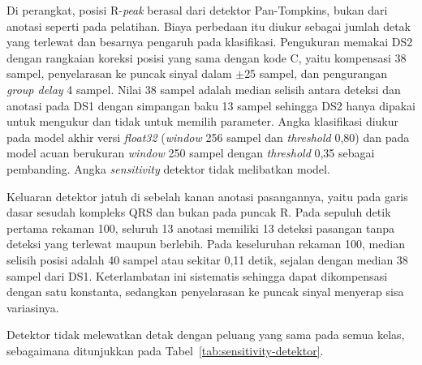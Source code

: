 Di perangkat, posisi R-\textit{peak} berasal dari detektor Pan-Tompkins, bukan dari anotasi seperti pada pelatihan. Biaya perbedaan itu diukur sebagai jumlah detak yang terlewat dan besarnya pengaruh pada klasifikasi. Pengukuran memakai DS2 dengan rangkaian koreksi posisi yang sama dengan kode C, yaitu kompensasi 38 sampel, penyelarasan ke puncak sinyal dalam $\pm$25 sampel, dan pengurangan \textit{group delay} 4 sampel. Nilai 38 sampel adalah median selisih antara deteksi dan anotasi pada DS1 dengan simpangan baku 13 sampel sehingga DS2 hanya dipakai untuk mengukur dan tidak untuk memilih parameter. Angka klasifikasi diukur pada model akhir versi \textit{float32} (\textit{window} 256 sampel dan \textit{threshold} 0,80) dan pada model acuan berukuran \textit{window} 250 sampel dengan \textit{threshold} 0,35 sebagai pembanding. Angka \textit{sensitivity} detektor tidak melibatkan model.

Keluaran detektor jatuh di sebelah kanan anotasi pasangannya, yaitu pada garis dasar sesudah kompleks QRS dan bukan pada puncak R. Pada sepuluh detik pertama rekaman 100, seluruh 13 anotasi memiliki 13 deteksi pasangan tanpa deteksi yang terlewat maupun berlebih. Pada keseluruhan rekaman 100, median selisih posisi adalah 40 sampel atau sekitar 0,11 detik, sejalan dengan median 38 sampel dari DS1. Keterlambatan ini sistematis sehingga dapat dikompensasi dengan satu konstanta, sedangkan penyelarasan ke puncak sinyal menyerap sisa variasinya.

Detektor tidak melewatkan detak dengan peluang yang sama pada semua kelas, sebagaimana ditunjukkan pada Tabel~\ref{tab:sensitivity-detektor}.

